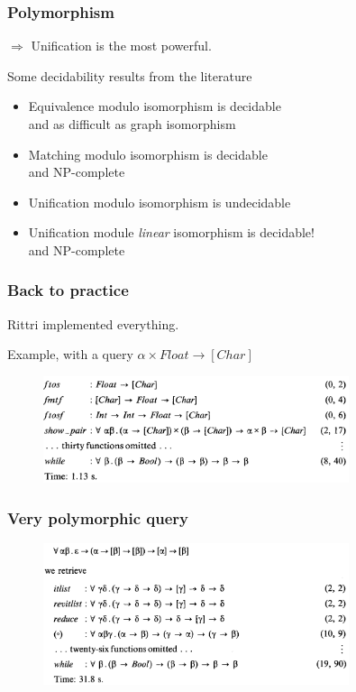 \documentclass[aspectratio=169,dvipsnames,svgnames,10pt]{beamer}
\begin{document}
\begin{frame}
  \frametitle{Polymorphism}

  $\Rightarrow$ Unification is the most powerful.

  Some decidability results from the literature
  \begin{itemize}
  \item Equivalence modulo isomorphism is decidable\\
    and as difficult as graph isomorphism
  \item Matching modulo isomorphism is decidable\\
    and NP-complete
  \item Unification modulo isomorphism is undecidable
  \item Unification module \emph{linear} isomorphism is decidable!\\
    and NP-complete
    
  \end{itemize}
  
\end{frame}


\begin{frame}
  \frametitle{Back to practice}
  Rittri implemented everything.

  Example, with a query $\alpha \times Float \to [Char]$
  \begin{figure}
    \centering
    \includegraphics[width=0.8\textwidth]{example}
  \end{figure}
\end{frame}


\begin{frame}
  \frametitle{Very polymorphic query}
  \begin{figure}
    \centering
    \includegraphics[width=0.8\textwidth]{example2}
  \end{figure}
\end{frame}
\end{document}
